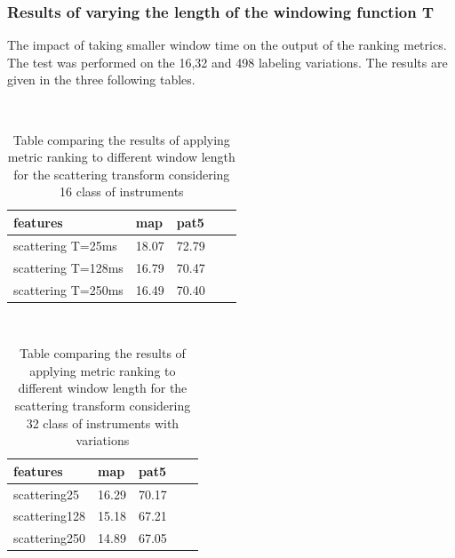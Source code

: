 \documentclass[hidelinks,12pt]{report}
\begin{document}
\subsubsection{Results of varying the length of the windowing function T}
The impact of taking smaller window time on the output of the ranking metrics. The test was performed on the 16,32 and 498 labeling variations. The results are given in the three following tables.
\begin{table} [H]
\begin{center} 
\ 
 \setlength{\tabcolsep}{.16667em} 
\begin{tabular}{ | l | l | l | l | l |}
features  & map & pat5  \\ 
\hline 
scattering T=25ms & 18.07 & 72.79  \\ 
 
scattering T=128ms  & 16.79 & 70.47  \\ 

scattering T=250ms  & 16.49 & 70.40  \\ 

\end{tabular} 
\end{center} 
\caption{Table comparing the results of applying metric ranking to different window length for the scattering transform considering 16 class of instruments} 
\label{you} 
\end{table}

\begin{table} [H]
\begin{center} 
\ 
 \setlength{\tabcolsep}{.16667em} 
\begin{tabular}{ | l | l | l | l | l |}
features & map & pat5 \\ 
\hline 
scattering25  & 16.29 & 70.17  \\ 

scattering128 & 15.18 & 67.21  \\ 

scattering250  & 14.89 & 67.05  \\ 

\end{tabular} 
\end{center} 
\caption{Table comparing the results of applying metric ranking to different window length for the scattering transform considering 32 class of instruments with variations} 
\label{you} 
\end{table} 
\end{document}
